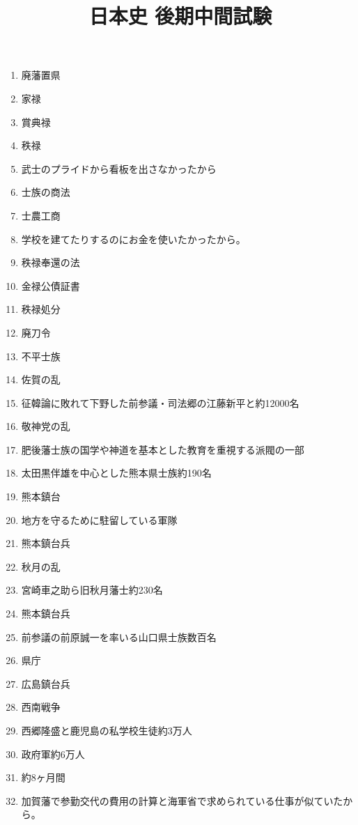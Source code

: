 \documentclass[]{jsarticle}
\begin{document}
\title{日本史 後期中間試験}
\author{}
\date{}

\maketitle

\renewcommand{\labelenumi}{(\arabic{enumi})}

\begin{enumerate}
	\item 廃藩置県
	\item 家禄
	\item 賞典禄
	\item 秩禄
	\item 武士のプライドから看板を出さなかったから
		\\
	\item 士族の商法
	\item 士農工商
	\item 学校を建てたりするのにお金を使いたかったから。
	\item 秩禄奉還の法
	\item 金禄公債証書
	\item 秩禄処分
	\item 廃刀令
	\item 不平士族
	\item 佐賀の乱
	\item 征韓論に敗れて下野した前参議・司法郷の江藤新平と約12000名
	\item 敬神党の乱
	\item 肥後藩士族の国学や神道を基本とした教育を重視する派閥の一部
	\item 太田黒伴雄を中心とした熊本県士族約190名
	\item 熊本鎮台
	\item 地方を守るために駐留している軍隊
	\item 熊本鎮台兵
	\item 秋月の乱
	\item 宮崎車之助ら旧秋月藩士約230名
	\item 熊本鎮台兵
	\item 前参議の前原誠一を率いる山口県士族数百名
	\item 県庁
	\item 広島鎮台兵
	\item 西南戦争
	\item 西郷隆盛と鹿児島の私学校生徒約3万人
	\item 政府軍約6万人
	\item 約8ヶ月間
	\item 加賀藩で参勤交代の費用の計算と海軍省で求められている仕事が似ていたから。

\end{enumerate}
\end{document}
